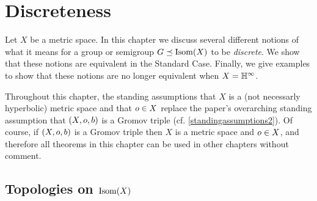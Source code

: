 

\chapter{Discreteness} \label{sectiondiscreteness}

Let $X$ be a metric space. In this chapter we discuss several different notions of what it means for a group or semigroup $G\preceq\operatorname{Isom}(X)$ to be \emph{discrete}. We show that these notions are equivalent in the Standard Case. Finally, we give examples to show that these notions are no longer equivalent when $X = \H^\infty$.

Throughout this chapter, the standing assumptions that $X$ is a (not necessarly hyperbolic) metric space and that $o\in X$ replace the paper's overarching standing assumption that $(X,o,b)$ is a Gromov triple (cf. \6\ref{standingassumptions2}). Of course, if $(X,o,b)$ is a Gromov triple then $X$ is a metric space and $o\in X$, and therefore all theorems in this chapter can be used in other chapters without comment.


\section{Topologies on $\operatorname{Isom}(X)$}
\label{subsectiontopologies}

